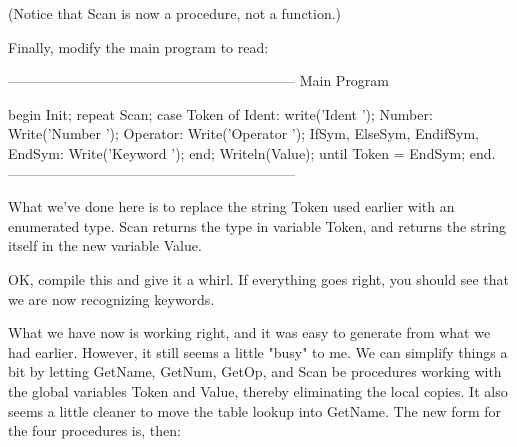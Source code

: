 \documentclass[float=false, crop=false]{standalone}
\begin{document}
(Notice that Scan is now a procedure, not a function.)


Finally, modify the main program to read:

\begin{code}
{--------------------------------------------------------------}
{ Main Program }

begin
   Init;
   repeat
      Scan;
      case Token of
        Ident: write('Ident ');
        Number: Write('Number ');
        Operator: Write('Operator ');
        IfSym, ElseSym, EndifSym, EndSym: Write('Keyword ');
      end;
      Writeln(Value);
   until Token = EndSym;
end.
{--------------------------------------------------------------}
\end{code}

What we've done here is to replace the string Token used earlier with an
enumerated type. Scan returns the type in variable Token, and returns the string
itself in the new variable Value.

OK, compile this and give it a whirl. If everything goes right, you should see
that we are now recognizing keywords.

What we have now is working right, and it was easy to generate from what we had
earlier. However, it still seems a little "busy" to me. We can simplify things a
bit by letting GetName, GetNum, GetOp, and Scan be procedures working with the
global variables Token and Value, thereby eliminating the local copies. It also
seems a little cleaner to move the table lookup into GetName. The new form for
the four procedures is, then:
\end{document}
